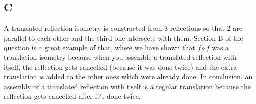 \documentclass[12pt, oneside]{article}
\begin{document}
\subsection{C}
A translated reflection isometry is constructed from 3 reflections so that 2 are parallel to each other and the third one intersects with them. Section B of the question is a great example of that, where we have shown that $f \circ f$ was a translation isometry because when you assemble a translated reflection with itself, the reflection gets cancelled (because it was done twice) and the extra translation is added to the other ones which were already done. In conclusion, an assembly of a translated reflection with itself is a regular translation because the reflection gets cancelled after it's done twice.
\end{document}
